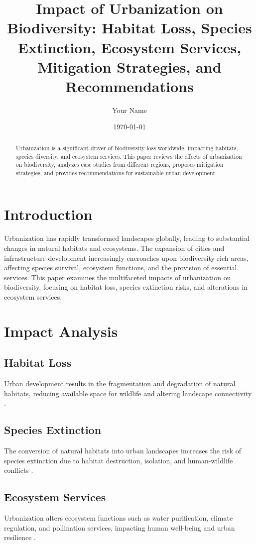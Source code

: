 \documentclass[12pt]{article}
\title{Impact of Urbanization on Biodiversity: Habitat Loss, Species Extinction, Ecosystem Services, Mitigation Strategies, and Recommendations}
\author{Your Name}
\date{\today}
\begin{document}
\maketitle

\begin{abstract}
Urbanization is a significant driver of biodiversity loss worldwide, impacting habitats, species diversity, and ecosystem services. This paper reviews the effects of urbanization on biodiversity, analyzes case studies from different regions, proposes mitigation strategies, and provides recommendations for sustainable urban development.
\end{abstract}

\section{Introduction}
Urbanization has rapidly transformed landscapes globally, leading to substantial changes in natural habitats and ecosystems. The expansion of cities and infrastructure development increasingly encroaches upon biodiversity-rich areas, affecting species survival, ecosystem functions, and the provision of essential services. This paper examines the multifaceted impacts of urbanization on biodiversity, focusing on habitat loss, species extinction risks, and alterations in ecosystem services.

\section{Impact Analysis}
\subsection{Habitat Loss}
Urban development results in the fragmentation and degradation of natural habitats, reducing available space for wildlife and altering landscape connectivity \citep{mcdonnell2015ecology, forman2014urban}.

\subsection{Species Extinction}
The conversion of natural habitats into urban landscapes increases the risk of species extinction due to habitat destruction, isolation, and human-wildlife conflicts \citep{loss2018biodiversity, gaston2006urban}.

\subsection{Ecosystem Services}
Urbanization alters ecosystem functions such as water purification, climate regulation, and pollination services, impacting human well-being and urban resilience \citep{elmqvist2013urban, haase2014challenges}.
\end{document}
